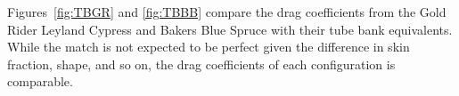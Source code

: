 \documentclass[12pt]{article}
\begin{document}
Figures~\ref{fig:TBGR} and \ref{fig:TBBB} compare the drag coefficients from the Gold Rider Leyland Cypress and Bakers Blue Spruce with their tube bank equivalents. While the match is not expected to be perfect given the difference in skin fraction, shape, and so on, the drag coefficients of each configuration is comparable.






\pagebreak
\end{document}

